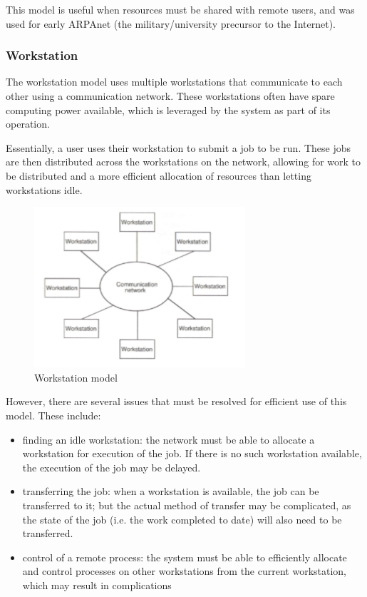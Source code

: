 This model is useful when resources must be shared with remote users, and was used for early ARPAnet (the military/university precursor to the Internet).

\subsubsection{Workstation}
The workstation model uses multiple workstations that communicate to each other using a communication network. These workstations often have spare computing power available, which is leveraged by the system as part of its operation.

Essentially, a user uses their workstation to submit a job to be run. These jobs are then distributed across the workstations on the network, allowing for work to be distributed and a more efficient allocation of resources than letting workstations idle.

\begin{figure}[h]
\centering
\includegraphics[width=0.5\linewidth]{figures/screenshot004}
\caption{Workstation model}
\label{fig:screenshot004}
\end{figure}

However, there are several issues that must be resolved for efficient use of this model. These include:
\begin{itemize}
\item finding an idle workstation: the network must be able to allocate a workstation for execution of the job. If there is no such workstation available, the execution of the job may be delayed.
\item transferring the job: when a workstation is available, the job can be transferred to it; but the actual method of transfer may be complicated, as the state of the job (i.e. the work completed to date) will also need to be transferred.
\item control of a remote process: the system must be able to efficiently allocate and control processes on other workstations from the current workstation, which may result in complications
\end{itemize}

